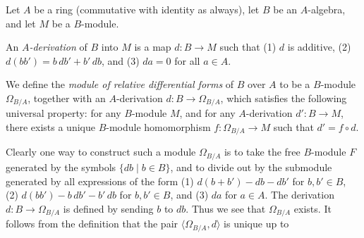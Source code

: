 {Let $A$ be a ring (commutative with identity as always), let $B$ be an $A$-algebra, and let $M$ be a $B$-module.

\Dfn An \emph{$A$-derivation} of $B$ into $M$ is a map $d\colon B\to M$ such that (1) $d$ is additive, (2) $d(bb')=b\,db'+b'\,db$, and (3) $da=0$ for all $a\in A$.

\Dfn We define the \emph{module of relative differential forms} of $B$ over $A$ to be a $B$-module $\Omega_{B/A}$, together with an $A$-derivation $d\colon B\to\Omega_{B/A}$, which satisfies the following universal property: for any $B$-module $M$, and for any $A$-derivation $d'\colon B\to M$, there exists a unique $B$-module homomorphism $f\colon\Omega_{B/A}\to M$ such that $d'=f\circ d$.

\smallskip
Clearly one way to construct such a module $\Omega_{B/A}$ is to take the free $B$-module $F$ generated by the symbols $\{db\mid b\in B\}$, and to divide out by the submodule generated by all expressions of the form (1) $d(b+b')-db-db'$ for $b,b'\in B$, (2) $d(bb')-b\,db'-b'\,db$ for $b,b'\in B$, and (3) $da$ for $a\in A$. The derivation $d\colon B\to\Omega_{B/A}$ is defined by sending $b$ to $db$. Thus we see that $\Omega_{B/A}$ exists. It follows from the definition that the pair $\langle\Omega_{B/A},d\rangle$ is unique up to
}
